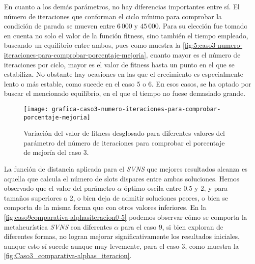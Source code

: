 
En cuanto a los demás parámetros, no hay diferencias importantes entre sí. El número de iteraciones que conforman el ciclo mínimo para comprobar la condición de parada se mueven entre $6\,000$ y $45\,000$. Para su elección fue tomado en cuenta no solo el valor de la función fitness, sino también el tiempo empleado, buscando un equilibrio entre ambos, pues como muestra la \autoref{fig:5:caso3-numero-iteraciones-para-comprobar-porcentaje-mejoria}, cuanto mayor es el número de iteraciones por ciclo, mayor es el valor de fitness hasta un punto en el que se estabiliza. No obstante hay ocasiones en las que el crecimiento es especialmente lento o más estable, como sucede en el caso 5 o 6. En esos casos, se ha optado por buscar el mencionado equilibrio, en el que el tiempo no fuese demasiado grande.

\begin{figure}
	\centering
	\texttt{[image: grafica-caso3-numero-iteraciones-para-comprobar-porcentaje-mejoria]}
	\caption{Variación del valor de fitness desglosado para diferentes valores del parámetro del número de iteraciones para comprobar el porcentaje de mejoría del caso 3.}
	\label{fig:5:caso3-numero-iteraciones-para-comprobar-porcentaje-mejoria}
\end{figure}



La función de distancia aplicada para el \textit{SVNS} que mejores resultados alcanza es aquella que calcula el número de slots dispares entre ambas soluciones. Hemos observado que el valor del parámetro $\alpha$ óptimo oscila entre 0.5 y 2, y para tamaños superiores a 2, o bien deja de admitir soluciones peores, o bien se comporta de la misma forma que con otros valores inferiores. En la \autoref{fig:caso9comparativa-alphasiteracion0-5} podemos observar cómo se comporta la metaheurística \textit{SVNS} con diferentes $\alpha$ para el caso 9, si bien exploran de diferentes formas, no logran mejorar significativamente los resultados iniciales, aunque esto sí sucede aunque muy levemente, para el caso 3, como muestra la \autoref{fig:Caso3_comparativa-alphas_iteracion}.

